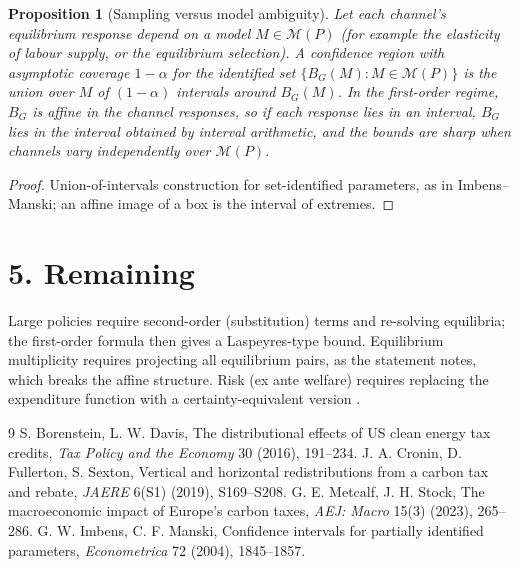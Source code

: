 \documentclass[11pt]{article}
\newtheorem{proposition}[theorem]{Proposition}
\theoremstyle{definition}
\begin{document}
\begin{proposition}[Sampling versus model ambiguity]\label{prop:sets}
Let each channel's equilibrium response depend on a model $M\in\mathcal M(P)$ (for example the elasticity of labour supply,
or the equilibrium selection). A confidence region with asymptotic coverage $1-\alpha$ for the identified set
$\{B_G(M):M\in\mathcal M(P)\}$ is the union over $M$ of $(1-\alpha)$ intervals around $B_G(M)$. In the first-order regime,
$B_G$ is affine in the channel responses, so if each response lies in an interval, $B_G$ lies in the interval obtained by
interval arithmetic, and the bounds are sharp when channels vary independently over $\mathcal M(P)$.
\end{proposition}
\begin{proof}
Union-of-intervals construction for set-identified parameters, as in Imbens--Manski; an affine image of a box is
the interval of extremes.
\end{proof}

\section*{5. Remaining}
Large policies require second-order (substitution) terms and re-solving equilibria; the first-order formula then gives a
Laspeyres-type bound. Equilibrium multiplicity requires projecting all equilibrium pairs, as the statement notes, which
breaks the affine structure. Risk (ex ante welfare) requires replacing the expenditure function with a certainty-equivalent
version \cite{bd,cfs,ms}.

\begin{thebibliography}{9}
 S. Borenstein, L. W. Davis, The distributional effects of US clean energy tax credits, \emph{Tax Policy and the Economy} 30 (2016), 191--234.
 J. A. Cronin, D. Fullerton, S. Sexton, Vertical and horizontal redistributions from a carbon tax and rebate, \emph{JAERE} 6(S1) (2019), S169--S208.
 G. E. Metcalf, J. H. Stock, The macroeconomic impact of Europe's carbon taxes, \emph{AEJ: Macro} 15(3) (2023), 265--286.
 G. W. Imbens, C. F. Manski, Confidence intervals for partially identified parameters, \emph{Econometrica} 72 (2004), 1845--1857.
\end{thebibliography}
\end{document}
